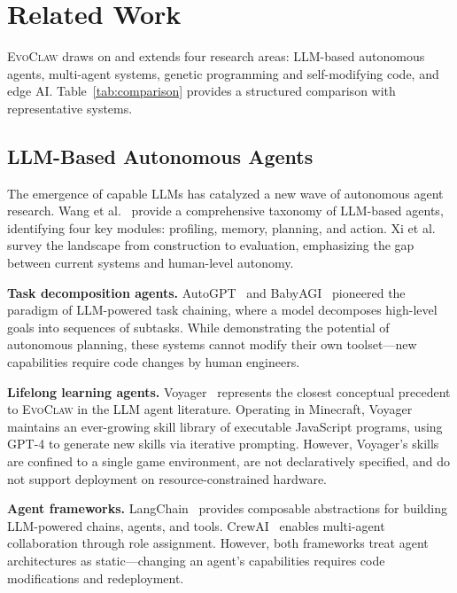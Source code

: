 \documentclass{article}
\newcommand{\evoclaw}{\textsc{EvoClaw}}
\begin{document}

\section{Related Work}
\label{sec:related}

\evoclaw{} draws on and extends four research areas: LLM-based autonomous agents, multi-agent systems, genetic programming and self-modifying code, and edge AI. Table~\ref{tab:comparison} provides a structured comparison with representative systems.


\subsection{LLM-Based Autonomous Agents}

The emergence of capable LLMs has catalyzed a new wave of autonomous agent research. Wang et al.~\cite{wang2023survey} provide a comprehensive taxonomy of LLM-based agents, identifying four key modules: profiling, memory, planning, and action. Xi et al.~\cite{xi2023rise} survey the landscape from construction to evaluation, emphasizing the gap between current systems and human-level autonomy.

\textbf{Task decomposition agents.} AutoGPT~\cite{auto_gpt} and BabyAGI~\cite{babyagi} pioneered the paradigm of LLM-powered task chaining, where a model decomposes high-level goals into sequences of subtasks. While demonstrating the potential of autonomous planning, these systems cannot modify their own toolset---new capabilities require code changes by human engineers.

\textbf{Lifelong learning agents.} Voyager~\cite{wang2023voyager} represents the closest conceptual precedent to \evoclaw{} in the LLM agent literature. Operating in Minecraft, Voyager maintains an ever-growing skill library of executable JavaScript programs, using GPT-4 to generate new skills via iterative prompting. However, Voyager's skills are confined to a single game environment, are not declaratively specified, and do not support deployment on resource-constrained hardware.

\textbf{Agent frameworks.} LangChain~\cite{langchain} provides composable abstractions for building LLM-powered chains, agents, and tools. CrewAI~\cite{crewai} enables multi-agent collaboration through role assignment. However, both frameworks treat agent architectures as static---changing an agent's capabilities requires code modifications and redeployment.
\end{document}

